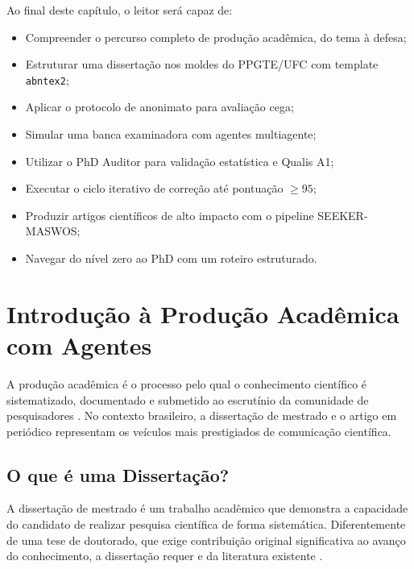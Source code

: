 Ao final deste capítulo, o leitor será capaz de:
\begin{itemize}
\item Compreender o percurso completo de produção acadêmica, do tema à defesa;
\item Estruturar uma dissertação nos moldes do PPGTE/UFC com template \texttt{abntex2};
\item Aplicar o protocolo de anonimato para avaliação cega;
\item Simular uma banca examinadora com agentes multiagente;
\item Utilizar o PhD Auditor para validação estatística e Qualis A1;
\item Executar o ciclo iterativo de correção até pontuação $\geq 95$;
\item Produzir artigos científicos de alto impacto com o pipeline SEEKER-MASWOS;
\item Navegar do nível zero ao PhD com um roteiro estruturado.
\end{itemize}

\section{Introdução à Produção Acadêmica com Agentes}
\label{sec:introducao-producao-academica}
\nivelzero

A produção acadêmica é o processo pelo qual o conhecimento científico é
sistematizado, documentado e submetido ao escrutínio da comunidade de
pesquisadores \cite{popper2005logica}. No contexto brasileiro, a dissertação de
mestrado e o artigo em periódico \qualisA{} representam os veículos mais
prestigiados de comunicação científica.

\subsection{O que é uma Dissertação?}

A dissertação de mestrado é um trabalho acadêmico que demonstra a capacidade do
candidato de realizar pesquisa científica de forma sistemática. Diferentemente de
uma tese de doutorado, que exige contribuição original significativa ao avanço do
conhecimento, a dissertação requer  e
 da literatura existente
\cite{abnt2023nbr14724}.

